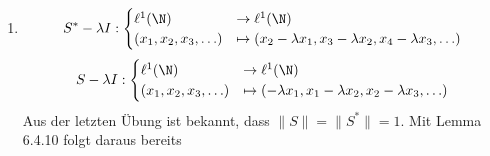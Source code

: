 \begin{solution}
\begin{enumerate}[label = (\alph*)]
  \item \begin{align*}
    S^* - \lambda I:
    \begin{cases}
      \ell^1(\N)             & \to     \ell^1(\N) \\
      (x_1, x_2, x_3, \ldots) & \mapsto (x_2 - \lambda x_1, x_3 - \lambda x_2, x_4 - \lambda x_3, \ldots)
    \end{cases}
  \end{align*}
  \begin{align*}
    S - \lambda I:
    \begin{cases}
      \ell^1(\N)             & \to     \ell^1(\N) \\
      (x_1, x_2, x_3, \ldots) & \mapsto (- \lambda x_1, x_1 - \lambda x_2, x_2 - \lambda x_3, \ldots)
    \end{cases}
  \end{align*}
  Aus der letzten Übung ist bekannt, dass $\|S\| = \|S^*\| = 1$. Mit Lemma 6.4.10
  folgt daraus bereits


\end{enumerate}
\end{solution}
